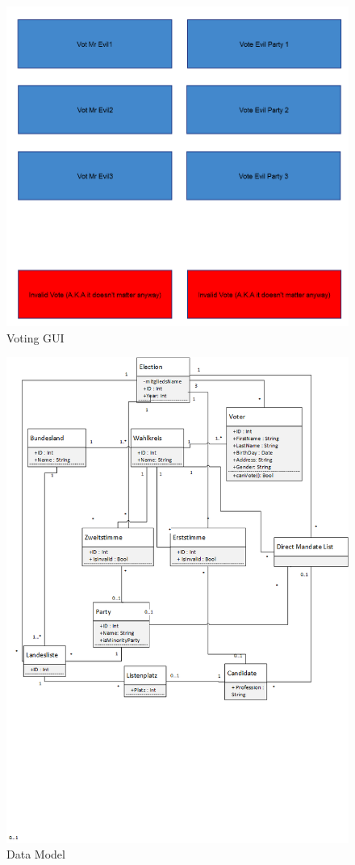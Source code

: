 \documentclass[10pt,a4paper]{article}
\begin{document}
\begin{figure}
	\centering
	\includegraphics[scale=.3]{VotingGUI.png}
	\caption{Voting GUI}
	\label{fig:voting}
\end{figure}



\begin{figure}
	\centering
	\includegraphics[scale=.8]{../Wahlschema.png}
	\caption{Data Model}
	\label{fig:model}
\end{figure}
\end{document}
